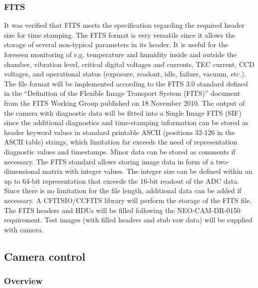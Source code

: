 \subsubsection{FITS}

It was verified that FITS meets the specification regarding the required header size for time stamping. The FITS format is very versatile since it allows the storage of several non-typical parameters in its header. It is useful for the foreseen monitoring of e.g. temperature and humidity inside and outside the chamber, vibration level, critical digital voltages and currents, TEC current, CCD voltages, and operational status (exposure, readout, idle, failure, vacuum, etc.).
The file format will be implemented according to the FITS 3.0 standard defined in the  “Definition of the Flexible Image Transport System (FITS)” document from the FITS Working Group published on 18 November 2010.
The output of the camera with diagnostic data will be fitted into a Single Image FITS (SIF) since the additional diagnostics and time-stamping information can be stored as header keyword values in standard printable ASCII (positions 32-126 in the ASCII table) strings, which limitation far exceeds the need of representation diagnostic values and timestamps. Minor data can be stored as comments if necessary.
The FITS standard allows storing image data in form of a two-dimensional matrix with integer values. The integer size can be defined within an up to 64-bit representation that exceeds the 16-bit readout of the ADC data. Since there is no limitation for the file length, additional data can be added if necessary.
A CFITSIO/CCFITS library will perform the storage of the FITS file. The FITS headers and HDUs will be filled following the NEO-CAM-DR-0150 requirement. Test images (with filled headers and stub raw data) will be supplied with camera.

\subsection{Camera control}
\label{sec:camctrl}

\subsubsection{Overview}

